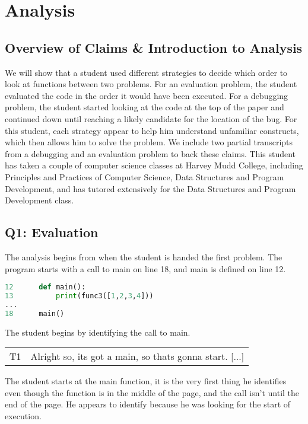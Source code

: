 \section{Analysis}
\subsection{Overview of Claims \& Introduction to Analysis}

We will show that a student used different strategies to decide which order to look at functions between two problems.
For an evaluation problem, the student evaluated the code in the order it would have been executed.
For a debugging problem, the student started looking at the code at the top of the paper and continued down until reaching a likely candidate for the location of the bug.
For this student, each strategy appear to help him understand unfamiliar constructs, which then allows him to solve the problem. 
We include two partial transcripts from a debugging and an evaluation problem to back these claims. 
This student has taken a couple of computer science classes at Harvey Mudd College, including Principles and Practices of Computer Science, Data Structures and Program Development, and has tutored extensively for the Data Structures and Program Development class.

\subsection{Q1: Evaluation}

The analysis begins from when the student is handed the first problem.
The program starts with a call to main on line 18, and main is defined on line 12.

\begin{lstlisting}[language=python]
12		def main():
13			print(func3([1,2,3,4]))
...
18		main()
\end{lstlisting}

The student begins by identifying the call to main.

\begin{tabular}{lp{13cm}}
T1&Alright so, its got a main, so thats gonna start. [...]\\
\end{tabular}

The student starts at the main function, it is the very first thing he identifies even though the function is in the middle of the page, and the call isn't until the end of the page.
He appears to identify because he was looking for the start of execution. \\

